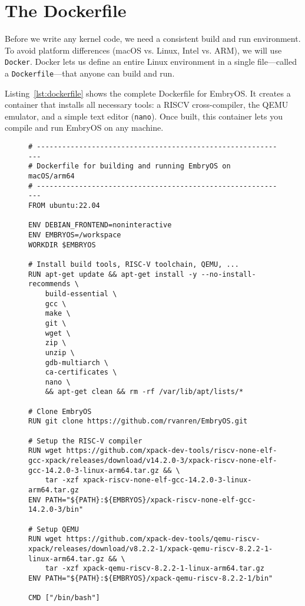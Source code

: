 \section{The Dockerfile}

Before we write any kernel code, we need a consistent build and run environment.
To avoid platform differences (macOS vs. Linux, Intel vs. ARM), we will use
\texttt{Docker}.  Docker lets us define an entire Linux environment in a single
file—called a \texttt{Dockerfile}—that anyone can build and run.

Listing~\ref{lst:dockerfile} shows the complete Dockerfile for EmbryOS.  It
creates a container that installs all necessary tools: a RISC\textendash V
cross-compiler, the QEMU emulator, and a simple text editor (\texttt{nano}).
Once built, this container lets you compile and run EmbryOS on any machine.

\begin{figure}[H]
\centering
\begin{minipage}{0.95\textwidth}
\begin{lstlisting}[style=oscode,language={},caption={Dockerfile for building and running EmbryOS on macOS/arm64},label={lst:dockerfile}]
# ------------------------------------------------------------
# Dockerfile for building and running EmbryOS on macOS/arm64
# ------------------------------------------------------------
FROM ubuntu:22.04

ENV DEBIAN_FRONTEND=noninteractive
ENV EMBRYOS=/workspace
WORKDIR $EMBRYOS

# Install build tools, RISC-V toolchain, QEMU, ...
RUN apt-get update && apt-get install -y --no-install-recommends \
    build-essential \
    gcc \
    make \
    git \
    wget \
    zip \
    unzip \
    gdb-multiarch \
    ca-certificates \
    nano \
    && apt-get clean && rm -rf /var/lib/apt/lists/*

# Clone EmbryOS
RUN git clone https://github.com/rvanren/EmbryOS.git

# Setup the RISC-V compiler
RUN wget https://github.com/xpack-dev-tools/riscv-none-elf-gcc-xpack/releases/download/v14.2.0-3/xpack-riscv-none-elf-gcc-14.2.0-3-linux-arm64.tar.gz && \
    tar -xzf xpack-riscv-none-elf-gcc-14.2.0-3-linux-arm64.tar.gz
ENV PATH="${PATH}:${EMBRYOS}/xpack-riscv-none-elf-gcc-14.2.0-3/bin"

# Setup QEMU
RUN wget https://github.com/xpack-dev-tools/qemu-riscv-xpack/releases/download/v8.2.2-1/xpack-qemu-riscv-8.2.2-1-linux-arm64.tar.gz && \
    tar -xzf xpack-qemu-riscv-8.2.2-1-linux-arm64.tar.gz
ENV PATH="${PATH}:${EMBRYOS}/xpack-qemu-riscv-8.2.2-1/bin"

CMD ["/bin/bash"]
\end{lstlisting}
\end{minipage}
\end{figure}

